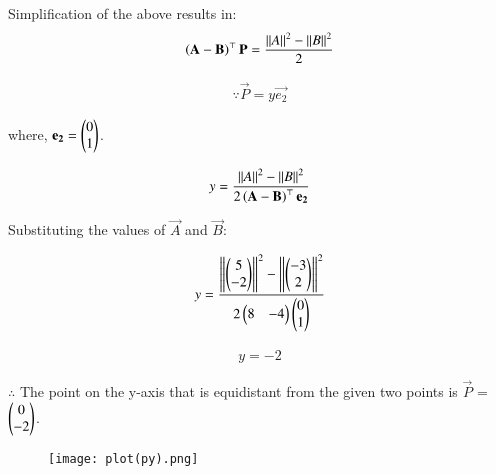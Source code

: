 \documentclass[journal]{IEEEtran}
\begin{document}
Simplification of the above results in:
\begin{align}
    \left(\mathbf{A}-\mathbf{B}\right)^\top\mathbf{P} = \frac{\left\lVert A\right\rVert^2 - \left\lVert B\right\rVert^2}{2} 
\end{align}

\begin{align}
    \because \vec{P} = y\vec{e_2}   
\end{align}

where, $\mathbf{e_2} = \begin{pmatrix}0\\1\end{pmatrix}$.

\begin{align}
    y = \frac{\left\lVert A\right\rVert^2-\left\lVert B\right\rVert^2}{2\left(\mathbf{A}-\mathbf{B}\right)^\top\mathbf{e_2}}
\end{align}

Substituting the values of $\vec{A}$ and $\vec{B}$:

\begin{align}
    y = \frac{\left\lVert\begin{pmatrix}5\\-2\end{pmatrix}\right\rVert^2 - \left\lVert\begin{pmatrix}-3 \\2\end{pmatrix}\right\rVert^2}{2\begin{pmatrix}8 & -4\end{pmatrix}\begin{pmatrix}0\\1\end{pmatrix}}
\end{align}

\begin{align}
    y = -2
\end{align}

$\therefore$ The point on the y-axis that is equidistant from the given two points is $\vec{P}$ = $\begin{pmatrix}0\\-2\end{pmatrix}$.

\begin{figure}[H]
    \centering
    \texttt{[image: plot(py).png]}
\end{figure}
\end{document}
